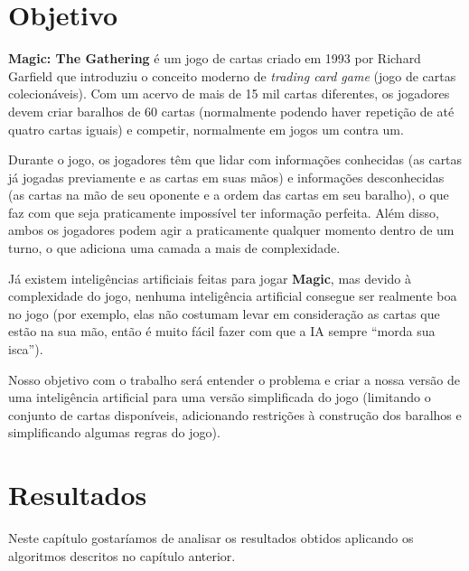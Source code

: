 \documentclass[dvipsnames]{book}
\begin{document}
\chapter*{Objetivo}
\textbf{Magic: The Gathering} é um jogo de cartas criado em 1993 por
Richard Garfield que introduziu o conceito moderno de \textit{trading
card game} (jogo de cartas colecionáveis). Com um acervo de mais de 15
mil cartas diferentes, os jogadores devem criar baralhos de 60 cartas
(normalmente podendo haver repetição de até quatro cartas iguais) e
competir, normalmente em jogos um contra um.
\par Durante o jogo, os jogadores têm que lidar com informações
conhecidas (as cartas já jogadas previamente e as cartas em suas mãos) e
informações desconhecidas (as cartas na mão de seu oponente e a ordem
das cartas em seu baralho), o que faz com que seja praticamente
impossível ter informação perfeita. Além disso, ambos os jogadores podem
agir a praticamente qualquer momento dentro de um turno, o que adiciona
uma camada a mais de complexidade.
\par Já existem inteligências artificiais feitas para jogar
\textbf{Magic}, mas devido à complexidade do jogo, nenhuma inteligência
artificial consegue ser realmente boa no jogo (por exemplo, elas não
costumam levar em consideração as cartas que estão na sua mão, então é
muito fácil fazer com que a IA sempre ``morda sua isca'').
\par Nosso objetivo com o trabalho será entender o problema e criar a
nossa versão de uma inteligência artificial para uma versão simplificada
do jogo (limitando o conjunto de cartas disponíveis, adicionando
restrições à construção dos baralhos e simplificando algumas regras do
jogo).





\newpage


\chapter{Resultados}
Neste capítulo gostaríamos de analisar os resultados obtidos aplicando os algoritmos descritos no
capítulo anterior.
\end{document}
